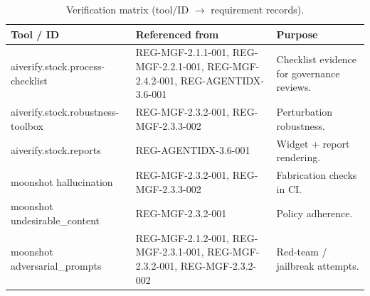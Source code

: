 \begin{table}[h]
\centering
\footnotesize
\begin{tabularx}{\textwidth}{p{3.6cm}p{5.6cm}X}
\toprule
\textbf{Tool / ID} & \textbf{Referenced from} & \textbf{Purpose} \\
\midrule
aiverify.stock.process-checklist &
  REG-MGF-2.1.1-001, REG-MGF-2.2.1-001, REG-MGF-2.4.2-001, REG-AGENTIDX-3.6-001 &
  Checklist evidence for governance reviews. \\
aiverify.stock.robustness-toolbox &
  REG-MGF-2.3.2-001, REG-MGF-2.3.3-002 &
  Perturbation robustness. \\
aiverify.stock.reports &
  REG-AGENTIDX-3.6-001 &
  Widget + report rendering. \\
moonshot hallucination &
  REG-MGF-2.3.2-001, REG-MGF-2.3.3-002 &
  Fabrication checks in CI. \\
moonshot undesirable\_content &
  REG-MGF-2.3.2-001 &
  Policy adherence. \\
moonshot adversarial\_prompts &
  REG-MGF-2.1.2-001, REG-MGF-2.3.1-001, REG-MGF-2.3.2-001, REG-MGF-2.3.2-002 &
  Red-team / jailbreak attempts. \\
\bottomrule
\end{tabularx}
\caption{Verification matrix (tool/ID $\to$ requirement records).}
\label{tab:verify-matrix}
\end{table}
\clearpage
